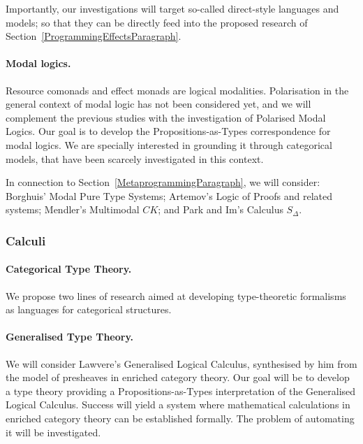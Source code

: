 \documentclass[11pt,twocolumn]{article}
\newcommand{\hl}[1]{#1}%
\newcommand{\eg}{\emph{eg.}}
\begin{document}
Importantly, our investigations will target so-called direct-style languages
and models; so that they can be directly feed into the proposed research of
Section~\ref{ProgrammingEffectsParagraph}.

\paragraph{Modal logics.}
\label{ModalLogicsParagraph}

Resource comonads and effect monads are logical modalities.  Polarisation in
the general context of modal logic has not been considered yet, and we will
complement the previous studies 
with the \hl{investigation} of Polarised
Modal Logics.  Our \hl{goal} is to develop the Propositions-as-Types
correspondence for modal logics.  We are specially interested in grounding it
through categorical models, that have been scarcely investigated in this
context.

In connection to Section~\ref{MetaprogrammingParagraph}, we will 
consider: 
%
Borghuis' Modal Pure Type Systems; %
%
Artemov's Logic of Proofs %
and related systems;
%
Mendler's Multimodal $CK$; %
and
%
Park and Im's Calculus $S_\Delta$. %

\subsubsection{Calculi}
\label{CalculiSubsection}

\paragraph*{Categorical Type Theory.}

We propose two lines of \hl{research} aimed at developing type-theoretic
formalisms as languages for categorical structures.

\paragraph{Generalised Type Theory.}
\label{GeneralisedTypeTheoryParagraph}

We will consider Lawvere's Generalised Logical Calculus, %
synthesised by him from the model of presheaves in enriched category theory.
Our \hl{goal} will be to develop a type theory providing a
Propositions-as-Types interpretation of the Generalised Logical Calculus.
Success will yield a system where mathematical calculations in enriched
category theory can be established formally.  The problem of automating it
will be investigated.
\end{document}

